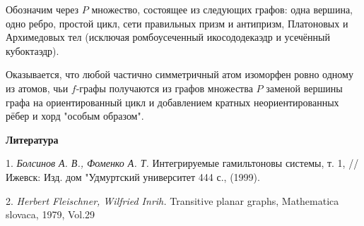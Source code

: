 	
	
	Обозначим через $P$ множество, состоящее из следующих графов: одна вершина, одно ребро, простой цикл, сети правильных призм и антипризм, Платоновых и Архимедовых тел (исключая ромбоусеченный икосододекаэдр и усечённый кубоктаэдр).
	
	
	
 Оказывается, что любой частично симметричный атом изоморфен ровно одному из атомов, чьи $f$-графы получаются из  графов множества $P$ заменой вершины графа на ориентированный цикл и  добавлением кратных неориентированных рёбер и хорд "особым образом".






\smallskip \centerline {\bf Литература} \nopagebreak

1. {\it Болсинов А. В., Фоменко А. Т.} Интегрируемые гамильтоновы системы, т. 1, // Ижевск: Изд. дом "Удмуртский университет 444 с., (1999).

2. {\it Herbert Fleischner, Wilfried Inrih.} Transitive planar graphs, Mathematica slovaca, 1979, Vol.29


